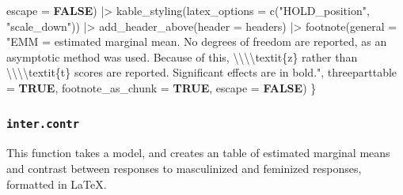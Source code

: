 \documentclass[
  bookmarksnumbered]{article}
\newenvironment{Shaded}{\begin{snugshade}}{\end{snugshade}}
\newcommand{\AttributeTok}[1]{\textcolor[rgb]{0.80,0.80,0.80}{#1}}
\newcommand{\ConstantTok}[1]{\textcolor[rgb]{0.86,0.64,0.64}{\textbf{#1}}}
\newcommand{\FunctionTok}[1]{\textcolor[rgb]{0.94,0.94,0.56}{#1}}
\newcommand{\NormalTok}[1]{\textcolor[rgb]{0.80,0.80,0.80}{#1}}
\newcommand{\SpecialCharTok}[1]{\textcolor[rgb]{0.86,0.64,0.64}{#1}}
\newcommand{\StringTok}[1]{\textcolor[rgb]{0.80,0.58,0.58}{#1}}
\begin{document}
\begin{Shaded}
\begin{Highlighting}[]
          \AttributeTok{escape =} \ConstantTok{FALSE}\NormalTok{) }\SpecialCharTok{|\textgreater{}} 
    \FunctionTok{kable\_styling}\NormalTok{(}\AttributeTok{latex\_options =} \FunctionTok{c}\NormalTok{(}\StringTok{"HOLD\_position"}\NormalTok{, }\StringTok{"scale\_down"}\NormalTok{)) }\SpecialCharTok{|\textgreater{}}
    \FunctionTok{add\_header\_above}\NormalTok{(}\AttributeTok{header =}\NormalTok{ headers) }\SpecialCharTok{|\textgreater{}} 
    \FunctionTok{footnote}\NormalTok{(}\AttributeTok{general =} \StringTok{"EMM = estimated marginal mean. No degrees of freedom are reported, }
\StringTok{             as an asymptotic method was used. Because of this, }\SpecialCharTok{\textbackslash{}\textbackslash{}\textbackslash{}\textbackslash{}}\StringTok{textit\{z\} rather than }
\StringTok{             }\SpecialCharTok{\textbackslash{}\textbackslash{}\textbackslash{}\textbackslash{}}\StringTok{textit\{t\} scores are reported. Significant effects are in bold."}\NormalTok{,}
             \AttributeTok{threeparttable =} \ConstantTok{TRUE}\NormalTok{, }
             \AttributeTok{footnote\_as\_chunk =} \ConstantTok{TRUE}\NormalTok{, }
             \AttributeTok{escape =} \ConstantTok{FALSE}\NormalTok{)}
\NormalTok{\}}
\end{Highlighting}
\end{Shaded}

\subsubsection{\texorpdfstring{\texttt{inter.contr}}{inter.contr}}\label{inter.contr}

This function takes a model, and creates an table of estimated marginal means and contrast between responses to masculinized and feminized responses, formatted in \LaTeX.
\end{document}
